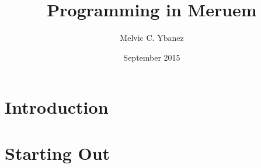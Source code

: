 \documentclass[12pt]{report}
\title{Programming in Meruem}
\author{Melvic C. Ybanez}
\date{September 2015}
\begin{document}
	\maketitle
	
	\tableofcontents
	
	\chapter*{Introduction}
	
	
	\chapter{Starting Out}
	
\end{document}
